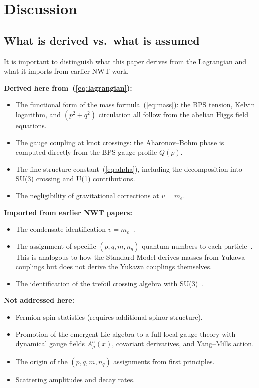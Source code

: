 \documentclass[11pt]{article}
\begin{document}
\section{Discussion}
\label{sec:discussion}

\subsection{What is derived vs.\ what is assumed}

It is important to distinguish what this paper derives from the
Lagrangian and what it imports from earlier NWT work.

\smallskip\noindent\textbf{Derived here from~(\ref{eq:lagrangian}):}
\begin{itemize}
\item The functional form of the mass formula~(\ref{eq:mass}):
      the BPS tension, Kelvin logarithm, and $(p^2+q^2)$ circulation
      all follow from the abelian Higgs field equations.
\item The gauge coupling at knot crossings: the Aharonov--Bohm phase
      is computed directly from the BPS gauge profile $Q(\rho)$.
\item The fine structure constant~(\ref{eq:alpha}), including the
      decomposition into SU(3) crossing and U(1) contributions.
\item The negligibility of gravitational corrections at $v = m_e$.
\end{itemize}

\noindent\textbf{Imported from earlier NWT papers:}
\begin{itemize}
\item The condensate identification $v = m_e$~\cite{NWT5}.
\item The assignment of specific $(p,q,m,n_q)$ quantum numbers to
      each particle~\cite{NWT1,NWT6}.  This is analogous to how the
      Standard Model derives masses from Yukawa couplings but does
      not derive the Yukawa couplings themselves.
\item The identification of the trefoil crossing algebra with
      SU(3)~\cite{NWT8}.
\end{itemize}

\noindent\textbf{Not addressed here:}
\begin{itemize}
\item Fermion spin-statistics (requires additional spinor structure).
\item Promotion of the emergent Lie algebra to a full local gauge
      theory with dynamical gauge fields $A_\mu^a(x)$, covariant
      derivatives, and Yang--Mills action.
\item The origin of the $(p,q,m,n_q)$ assignments from first principles.
\item Scattering amplitudes and decay rates.
\end{itemize}
\end{document}
